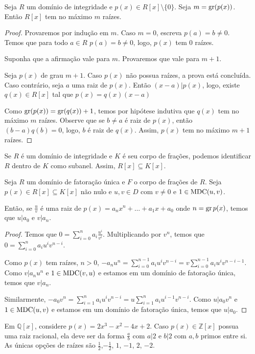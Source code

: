 \begin{prop}
Seja $R$ um domínio de integridade e $p(x)\in R[x]\setminus \{0\}$. Seja $m=\operatorname{gr} (p(x))$. Então $R[x]$ tem no máximo $m$ raízes.
\end{prop}
\begin{proof}
    Provaremos por indução em $m$.
    Caso $m=0$, escreva $p(a)=b\neq 0$. Temos que para todo $a \in R$ $p(a)=b\neq 0$, logo, $p(x)$ tem $0$ raízes.

    Suponha que a afirmação vale para $m$. Provaremos que vale para $m+1$.
    
    Seja $p(x)$ de grau $m+1$. Caso $p(x)$ não possua raízes, a prova está concluída. Caso contrário, seja $a$ uma raiz de $p(x)$. Então $(x-a)|p(x)$, logo, existe $q(x) \in R[x]$ tal que $p(x)=q(x)(x-a)$

    Como $\operatorname{gr}(p(x))=\operatorname{gr}(q(x))+1$, temos por hipótese indutiva que $q(x)$ tem no máximo $m$ raízes. Observe que se $b\neq a$ é raiz de $p(x)$, então $(b-a)q(b)=0$, logo, $b$ é raiz de $q(x)$. Assim, $p(x)$ tem no máximo $m+1$ raízes.
\end{proof}

Se $R$ é um domínio de integridade e $K$ é seu corpo de frações, podemos identificar $R$ dentro de $K$ como subanel. Assim, $R[x]\subseteq K[x]$.
\begin{prop}
Seja $R$ um domínio de fatoração única e $F$ o corpo de frações de $R$. Seja $p(x)\in R[x]\subseteq K[x]$ não nulo e $u, v \in D$ com $v \neq 0$ e $1\in \operatorname{MDC}(u, v)$.

Então, se $\frac{u}{v}$ é uma raiz de $p(x)=a_nx^n+\dots+a_1x+a_0$ onde $n=\operatorname{gr} p(x)$, temos que $u|a_0$ e $v|a_n$.
\end{prop}
\begin{proof}
    Temos que $0=\sum_{i=0}^na_i \frac{u^i}{v^i}$. Multiplicando por $v^n$, temos que $0=\sum_{i=0}^n a_i u^iv^{n-i}$.

    Como $p(x)$ tem raízes, $n>0$, $-a_nu^n=\sum_{i=0}^{n-1}a_iu^iv^{n-i}=v\sum_{i=0}^{n-1}a_iu^iv^{n-i-1}$. Como $v|a_n u^n$ e $1\in \operatorname{MDC}(v, u)$ e estamos em um domínio de fatoração única, temos que $v|a_n$.

    Similarmente, $-a_0v^n=\sum_{i=1}^n a_i u^iv^{n-i}=u\sum_{i=1}^n a_i u^{i-1}v^{n-i}$. Como $u|a_0v^n$ e $1\in \operatorname{MDC}(u, v)$ e estamos em um domínio de fatoração única, temos que $u|a_0$.
\end{proof}


\begin{exemplo}
Em $\mathbb Q[x]$, considere $p(x)=2x^3- x^2 - 4 x  + 2$. Caso $p(x)\in \mathbb Z[x]$ possua uma raiz racional, ela deve ser da forma $\frac{a}{b}$ com $a|2$ e $b|2$ com $a, b$ primos entre si. As únicas opções de raízes são $\frac{1}{2}$,$-\frac{1}{2}$, $1$, $-1$, $2$, $-2$.
\end{exemplo}
